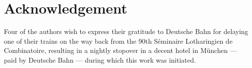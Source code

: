 \documentclass[12pt,reqno]{amsart}
\numberwithin{equation}{section}
\theoremstyle{definition}
\begin{document}
\section*{Acknowledgement}
Four of the authors wish to express their gratitude to Deutsche Bahn
for delaying one of their trains on the way back from the 90th
S\'eminaire Lotharingien de Combinatoire, resulting in a nightly
stopover in a decent hotel in M\"unchen --- paid by Deutsche Bahn
--- during which this work was initiated.



\end{document}
